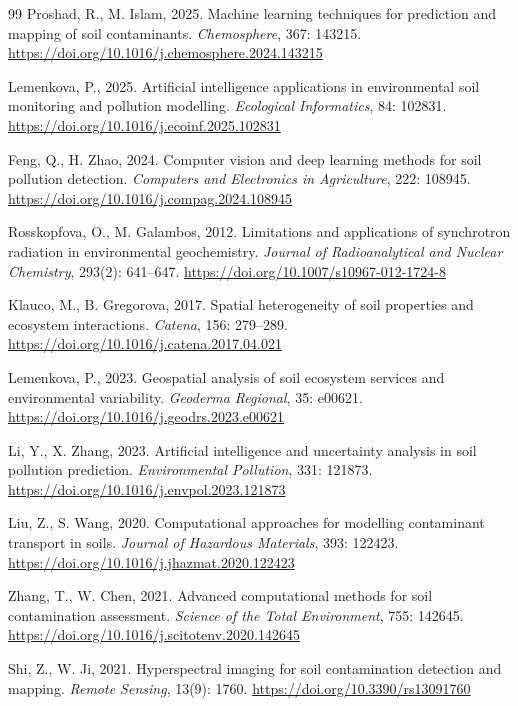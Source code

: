 \documentclass[sn-mathphys-num]{sn-jnl}
\begin{document}
\begin{thebibliography}{99}
Proshad, R., M. Islam, 2025.
Machine learning techniques for prediction and mapping of soil contaminants.
\textit{Chemosphere}, 367: 143215.
\url{https://doi.org/10.1016/j.chemosphere.2024.143215}

Lemenkova, P., 2025.
Artificial intelligence applications in environmental soil monitoring and
pollution modelling.
\textit{Ecological Informatics}, 84: 102831.
\url{https://doi.org/10.1016/j.ecoinf.2025.102831}

Feng, Q., H. Zhao, 2024.
Computer vision and deep learning methods for soil pollution detection.
\textit{Computers and Electronics in Agriculture}, 222: 108945.
\url{https://doi.org/10.1016/j.compag.2024.108945}

Rosskopfova, O., M. Galambos, 2012.
Limitations and applications of synchrotron radiation in environmental
geochemistry.
\textit{Journal of Radioanalytical and Nuclear Chemistry}, 293(2): 641--647.
\url{https://doi.org/10.1007/s10967-012-1724-8}

Klauco, M., B. Gregorova, 2017.
Spatial heterogeneity of soil properties and ecosystem interactions.
\textit{Catena}, 156: 279--289.
\url{https://doi.org/10.1016/j.catena.2017.04.021}

Lemenkova, P., 2023.
Geospatial analysis of soil ecosystem services and environmental variability.
\textit{Geoderma Regional}, 35: e00621.
\url{https://doi.org/10.1016/j.geodrs.2023.e00621}

Li, Y., X. Zhang, 2023.
Artificial intelligence and uncertainty analysis in soil pollution prediction.
\textit{Environmental Pollution}, 331: 121873.
\url{https://doi.org/10.1016/j.envpol.2023.121873}

Liu, Z., S. Wang, 2020.
Computational approaches for modelling contaminant transport in soils.
\textit{Journal of Hazardous Materials}, 393: 122423.
\url{https://doi.org/10.1016/j.jhazmat.2020.122423}

Zhang, T., W. Chen, 2021.
Advanced computational methods for soil contamination assessment.
\textit{Science of the Total Environment}, 755: 142645.
\url{https://doi.org/10.1016/j.scitotenv.2020.142645}

Shi, Z., W. Ji, 2021.
Hyperspectral imaging for soil contamination detection and mapping.
\textit{Remote Sensing}, 13(9): 1760.
\url{https://doi.org/10.3390/rs13091760}


\end{thebibliography}
\end{document}
